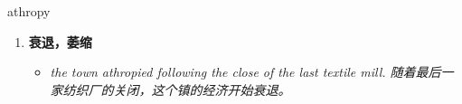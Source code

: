 
\begin{frame}
{\huge athropy}
\begin{center}
\begin{enumerate}\Large
  \item \textbf{衰退，萎缩}
  \begin{itemize}
    \item \em{\Large{the town athropied following the close of the last textile mill. 随着最后一家纺织厂的关闭，这个镇的经济开始衰退。}}
  \end{itemize}
\end{enumerate}
\end{center}
\end{frame}
